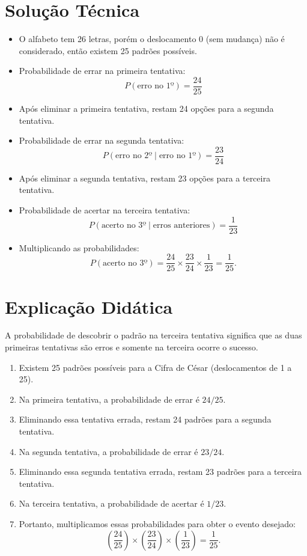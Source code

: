 \documentclass[a4paper,12pt]{article}
\begin{document}
\section*{Solução Técnica}
\begin{itemize}
  \item O alfabeto tem 26 letras, porém o deslocamento 0 (sem mudança) não é considerado, então existem 25 padrões possíveis.
  \item Probabilidade de errar na primeira tentativa:
  \[
  P(\text{erro no 1º}) = \frac{24}{25}
  \]
  \item Após eliminar a primeira tentativa, restam 24 opções para a segunda tentativa.
  \item Probabilidade de errar na segunda tentativa:
  \[
  P(\text{erro no 2º} \mid \text{erro no 1º}) = \frac{23}{24}
  \]
  \item Após eliminar a segunda tentativa, restam 23 opções para a terceira tentativa.
  \item Probabilidade de acertar na terceira tentativa:
  \[
  P(\text{acerto no 3º} \mid \text{erros anteriores}) = \frac{1}{23}
  \]
  \item Multiplicando as probabilidades:
  \[
  P(\text{acerto no 3º}) = \frac{24}{25} \times \frac{23}{24} \times \frac{1}{23} = \frac{1}{25}.
  \]
\end{itemize}

\section*{Explicação Didática}
A probabilidade de descobrir o padrão na terceira tentativa significa que as duas primeiras tentativas são erros e somente na terceira ocorre o sucesso.

\begin{enumerate}
  \item Existem 25 padrões possíveis para a Cifra de César (deslocamentos de 1 a 25).
  \item Na primeira tentativa, a probabilidade de errar é $24/25$.
  \item Eliminando essa tentativa errada, restam 24 padrões para a segunda tentativa.
  \item Na segunda tentativa, a probabilidade de errar é $23/24$.
  \item Eliminando essa segunda tentativa errada, restam 23 padrões para a terceira tentativa.
  \item Na terceira tentativa, a probabilidade de acertar é $1/23$.
  \item Portanto, multiplicamos essas probabilidades para obter o evento desejado:
  \[
  \left(\frac{24}{25}\right) \times \left(\frac{23}{24}\right) \times \left(\frac{1}{23}\right) = \frac{1}{25}.
  \]
\end{enumerate}
\end{document}
